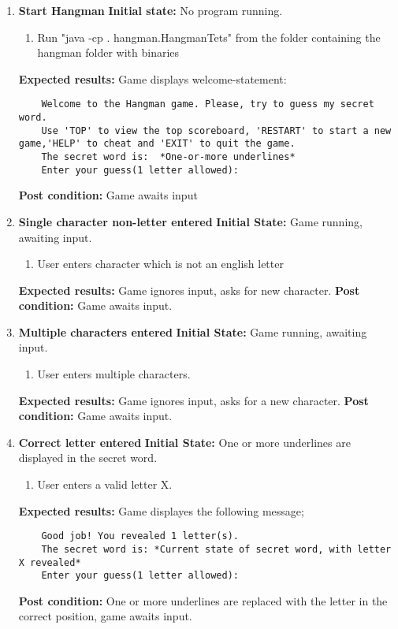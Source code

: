 \documentclass{article}
\begin{document}
	\begin{flushleft} %
	\begin{enumerate}

	\item \textbf{Start Hangman}\newline
	\textbf{Initial state:} No program running.
	\begin{enumerate}
	\item Run "java -cp . hangman.HangmanTets" from the folder containing the hangman folder with binaries
	\end{enumerate}
	\textbf{Expected results:} Game displays welcome-statement:
	\begin{verbatim}
	Welcome to the Hangman game. Please, try to guess my secret word.
	Use 'TOP' to view the top scoreboard, 'RESTART' to start a new game,'HELP' to cheat and 'EXIT' to quit the game.
	The secret word is:  *One-or-more underlines*
	Enter your guess(1 letter allowed):
	\end{verbatim}
	\textbf{Post condition:} Game awaits input

	\item \textbf{Single character non-letter entered}\newline
	\textbf{Initial State:} Game running, awaiting input.
	\begin{enumerate}
	\item User enters character which is not an english letter
	\end{enumerate}
	\textbf{Expected results:} Game ignores input, asks for new character.\newline
	\textbf{Post condition:} Game awaits input.

	\item \textbf{Multiple characters entered}\newline
	\textbf{Initial State:} Game running, awaiting input.
	\begin{enumerate}
	\item User enters multiple characters.
	\end{enumerate}
	\textbf{Expected results:} Game ignores input, asks for a new character.\newline
	\textbf{Post condition:} Game awaits input.

	\item \textbf{Correct letter entered}\newline
	\textbf{Initial State:} One or more underlines are displayed in the secret word.
	\begin{enumerate}
	\item User enters a valid letter X.
	\end{enumerate}
	\textbf{Expected results:} Game displayes the following message; 
	\begin{verbatim}
	Good job! You revealed 1 letter(s).
	The secret word is: *Current state of secret word, with letter X revealed*
	Enter your guess(1 letter allowed):
	\end{verbatim}
	\textbf{Post condition:} One or more underlines are replaced with the letter in the correct position, game awaits input.


\end{enumerate}
\end{flushleft}
\end{document}
